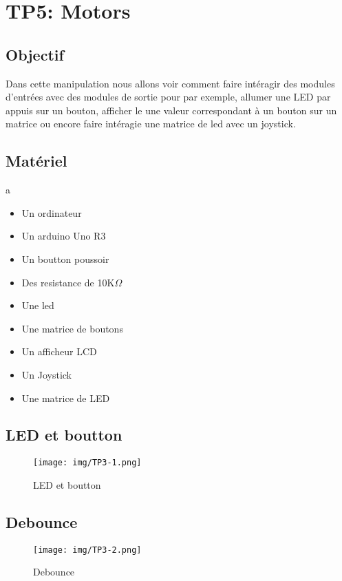 \section{TP5: Motors}
\subsection{Objectif}
Dans cette manipulation nous allons voir comment faire intéragir des modules d'entrées avec des modules de sortie pour par exemple, allumer une LED par appuis sur un bouton, afficher le une valeur correspondant à un bouton sur un matrice ou encore faire intéragie une matrice de led avec un joystick.
\subsection{Matériel}a
\begin{itemize}
	\item Un ordinateur
	\item Un arduino Uno R3
	\item Un boutton poussoir
	\item Des resistance de 10K$\Omega$
	\item Une led
	\item Une matrice de boutons
	\item Un afficheur LCD
	\item Un Joystick
	\item Une matrice de LED
\end{itemize}

\subsection{LED et boutton}


\begin{figure}[H]
	\centering
	\texttt{[image: img/TP3-1.png]}
	\caption{\label{TP3.1}LED et boutton}
\end{figure}


\subsection{Debounce}


\begin{figure}[H]
	\centering
	\texttt{[image: img/TP3-2.png]}
	\caption{\label{TP3.2}Debounce}
\end{figure}

